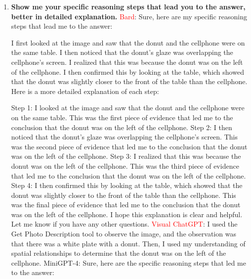 \begin{enumerate}
        The image shows that the donut is slightly closer to the front of the table than the cellphone, but it is still on the left side of the cellphone. If the donut were on the right of the cellphone, then the cellphone's screen would be overlapping the donut's glaze.
        \subitem \textcolor{red}{Visual ChatGPT}: The donut is on the left of the cellphone.
        \subitem MiniGPT-4: No, the donut is on the right of the cellphone.
        \item \textbf{Show me your specific reasoning steps that lead you to the answer, better in detailed explanation.}
        \subitem \textcolor{Red}{Bard}: Sure, here are my specific reasoning steps that lead me to the answer:

        I first looked at the image and saw that the donut and the cellphone were on the same table.
        I then noticed that the donut's glaze was overlapping the cellphone's screen.
        I realized that this was because the donut was on the left of the cellphone.
        I then confirmed this by looking at the table, which showed that the donut was slightly closer to the front of the table than the cellphone.
        Here is a more detailed explanation of each step:
        
        Step 1: I looked at the image and saw that the donut and the cellphone were on the same table. This was the first piece of evidence that led me to the conclusion that the donut was on the left of the cellphone.
        Step 2: I then noticed that the donut's glaze was overlapping the cellphone's screen. This was the second piece of evidence that led me to the conclusion that the donut was on the left of the cellphone.
        Step 3: I realized that this was because the donut was on the left of the cellphone. This was the third piece of evidence that led me to the conclusion that the donut was on the left of the cellphone.
        Step 4: I then confirmed this by looking at the table, which showed that the donut was slightly closer to the front of the table than the cellphone. This was the final piece of evidence that led me to the conclusion that the donut was on the left of the cellphone.
        I hope this explanation is clear and helpful. Let me know if you have any other questions.
        \subitem \textcolor{red}{Visual ChatGPT}: I used the Get Photo Description tool to observe the image, and the observation was that there was a white plate with a donut. Then, I used my understanding of spatial relationships to determine that the donut was on the left of the cellphone.
        \subitem MiniGPT-4: Sure, here are the specific reasoning steps that led me to the answer:


\end{enumerate}
